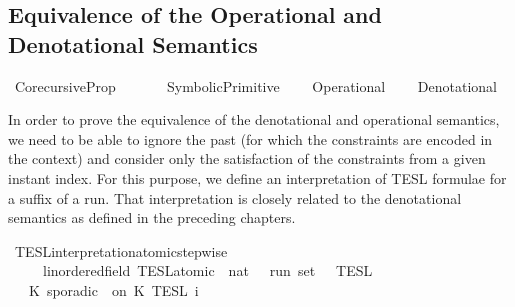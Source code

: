 %
\begin{isabellebody}%
%
%
\begin{isamarkuptext}%
\chapter[Semantics Equivalence]{Equivalence of the Operational and Denotational Semantics}%
\end{isamarkuptext}\isamarkuptrue%
%
\isadelimtheory
%
\endisadelimtheory
%
\isatagtheory
{}\isamarkupfalse%
\ Corecursive{\isacharunderscore}Prop\isanewline
\ \ \isanewline
\ \ \ \ SymbolicPrimitive\isanewline
\ \ \ \ Operational\isanewline
\ \ \ \ Denotational\isanewline
\isanewline
{}%
\endisatagtheory
{\isafoldtheory}%
%
\isadelimtheory
%
\endisadelimtheory
%
\isadelimdocument
%
\endisadelimdocument
%
\isatagdocument
%
\isamarkuptrue%
%
\endisatagdocument
{\isafolddocument}%
%
\isadelimdocument
%
\endisadelimdocument
%
\begin{isamarkuptext}%
In order to prove the equivalence of the denotational and operational semantics, 
  we need to be able to ignore the past (for which the constraints are encoded 
  in the context) and consider only the satisfaction of the constraints from
  a given instant index.
  For this purpose, we define an interpretation of TESL formulae for a suffix of a run.
  That interpretation is closely related to the denotational semantics as
  defined in the preceding chapters.%
\end{isamarkuptext}\isamarkuptrue%
\isamarkupfalse%
\ TESL{\isacharunderscore}interpretation{\isacharunderscore}atomic{\isacharunderscore}stepwise\isanewline
\ \ \ \ {\isacharcolon}{\isacharcolon}\ {\isacartoucheopen}{\isacharparenleft}{\isacharprime}{\isasymtau}{\isacharcolon}{\isacharcolon}linordered{\isacharunderscore}field{\isacharparenright}\ TESL{\isacharunderscore}atomic\ {\isasymRightarrow}\ nat\ {\isasymRightarrow}\ {\isacharprime}{\isasymtau}\ run\ set{\isacartoucheclose}\ {\isacharparenleft}{\isacartoucheopen}{\isasymlbrakk}\ {\isacharunderscore}\ {\isasymrbrakk}\isactrlsub T\isactrlsub E\isactrlsub S\isactrlsub L\isactrlbsup {\isasymge}\ {\isacharunderscore}\isactrlesup {\isacartoucheclose}{\isacharparenright}\isanewline
{}\isanewline
\ \ {\isacartoucheopen}{\isasymlbrakk}\ K\ sporadic\ {\isasymtau}\ on\ K\ {\isasymrbrakk}\isactrlsub T\isactrlsub E\isactrlsub S\isactrlsub L\isactrlbsup {\isasymge}\ i\isactrlesup \ {\isacharequal}\isanewline

\end{isabellebody}
